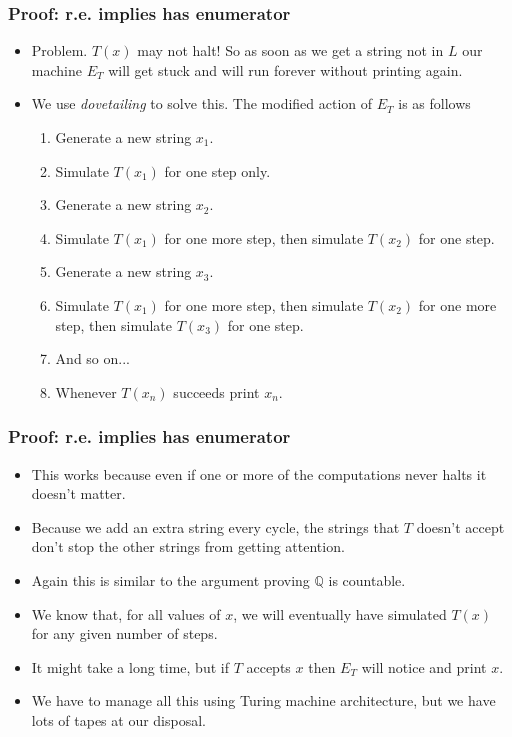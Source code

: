 \documentclass[handout]{beamer}
\begin{document}
\begin{frame}
\frametitle{Proof: r.e. implies has enumerator}
\begin{itemize}
\item Problem. $T(x)$ may not halt! So as soon as we get a string not in $L$ our machine $E_T$ will get stuck and will run forever without printing again. 
\item We use \emph{dovetailing} to solve this. The modified action of $E_T$ is as follows
\begin{enumerate}
\item Generate a new string $x_1$.
\item Simulate $T(x_1)$ for one step only.
\item Generate a new string $x_2$.
\item Simulate $T(x_1)$ for one more step, then simulate $T(x_2)$ for one step.
\item Generate a new string $x_3$.
\item Simulate $T(x_1)$ for one more step, then simulate $T(x_2)$ for one more step, then simulate $T(x_3)$ for one step.
\item And so on...
\item Whenever $T(x_n)$ succeeds print $x_n$. 
\end{enumerate}
\end{itemize} 
\end{frame}

\begin{frame}
\frametitle{Proof: r.e. implies has enumerator}
\begin{itemize}
\item This works because even if one or more of the computations never halts it doesn't matter. 
\vspace{0.2cm}
\item Because we add an extra string every cycle, the strings that $T$ doesn't accept don't stop the other strings from getting attention. 
\vspace{0.2cm}
\item Again this is similar to the argument proving $\mathbb{Q}$ is countable.
\vspace{0.2cm}
\item We know that, for all values of $x$, we will eventually have simulated $T(x)$ for any given number of steps. 
\vspace{0.2cm}
\item It might take a long time, but if $T$ accepts $x$ then $E_T$ will notice and print $x$. 
\vspace{0.2cm}
\item We have to manage all this using Turing machine architecture, but we have lots of tapes at our disposal.
\end{itemize} 
\end{frame}
\end{document}
